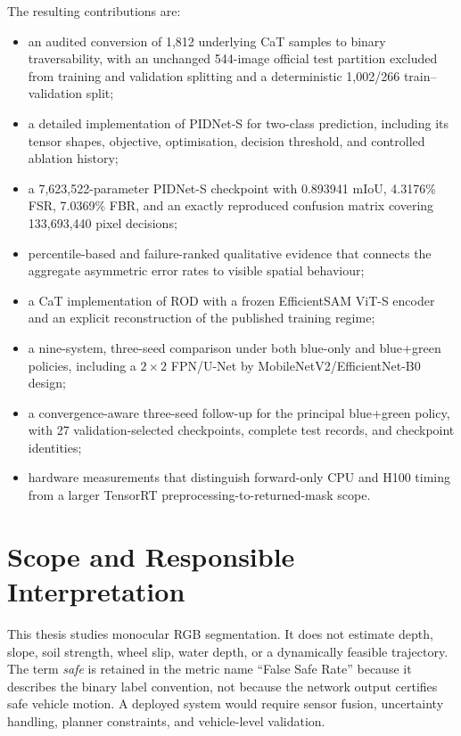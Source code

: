 The resulting contributions are:
\begin{itemize}
  \item an audited conversion of 1,812 underlying CaT samples to binary
  traversability, with an unchanged 544-image official test partition excluded
  from training and validation splitting and a
  deterministic 1,002/266 train--validation split;
  \item a detailed implementation of PIDNet-S for two-class prediction,
  including its tensor shapes, objective, optimisation, decision threshold,
  and controlled ablation history;
  \item a 7,623,522-parameter PIDNet-S checkpoint with 0.893941 mIoU,
  4.3176\% FSR, 7.0369\% FBR, and an exactly reproduced confusion matrix
  covering 133,693,440 pixel decisions;
  \item percentile-based and failure-ranked qualitative evidence that connects
  the aggregate asymmetric error rates to visible spatial behaviour;
  \item a CaT implementation of ROD with a frozen EfficientSAM ViT-S encoder
  and an explicit reconstruction of the published training regime;
  \item a nine-system, three-seed comparison under both blue-only and
  blue+green policies, including a $2\times2$ FPN/U-Net by
  MobileNetV2/EfficientNet-B0 design;
  \item a convergence-aware three-seed follow-up for the principal blue+green
  policy, with 27 validation-selected checkpoints, complete test records, and
  checkpoint identities;
  \item hardware measurements that distinguish forward-only CPU and H100
  timing from a larger TensorRT preprocessing-to-returned-mask scope.
\end{itemize}

\section{Scope and Responsible Interpretation}

This thesis studies monocular RGB segmentation. It does not estimate depth,
slope, soil strength, wheel slip, water depth, or a dynamically feasible
trajectory. The term \emph{safe} is retained in the metric name ``False Safe
Rate'' because it describes the binary label convention, not because the
network output certifies safe vehicle motion. A deployed system would require
sensor fusion, uncertainty handling, planner constraints, and vehicle-level
validation.

